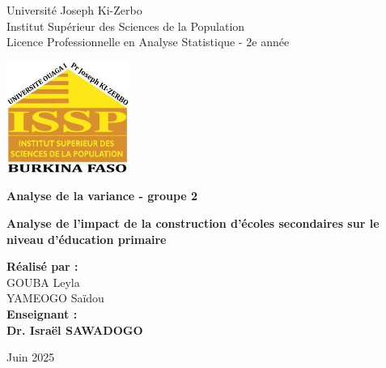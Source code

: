 \begin{titlepage}
    \centering
    \vspace{1.5cm}
    {\Large Université Joseph Ki-Zerbo \\ 
    Institut Supérieur des Sciences de la Population \\ 
    Licence Professionnelle en Analyse Statistique - 2e année \par}
    \vspace{1cm}

    \includegraphics[width=4cm]{logo.jpg}\\
    \vspace{1cm}
    {\Huge\bfseries Analyse de la variance - groupe 2 \par}
    \vspace{1cm}
    {\Huge\bfseries\textcolor{BrickRed}{Analyse de l’impact de la construction d’écoles secondaires sur le niveau 
d’éducation primaire } \par}
    \vspace{1cm}
    \begin{flushleft}
        {\Large
        \textbf{Réalisé par :} \\
        GOUBA Leyla \\
        YAMEOGO Saïdou \\
        \vspace{1cm}
        \textbf{Enseignant :} \\
        \textbf{Dr. Israël SAWADOGO }
        }
    \end{flushleft}
    \vfill
    \centering
    Juin 2025
\end{titlepage}
